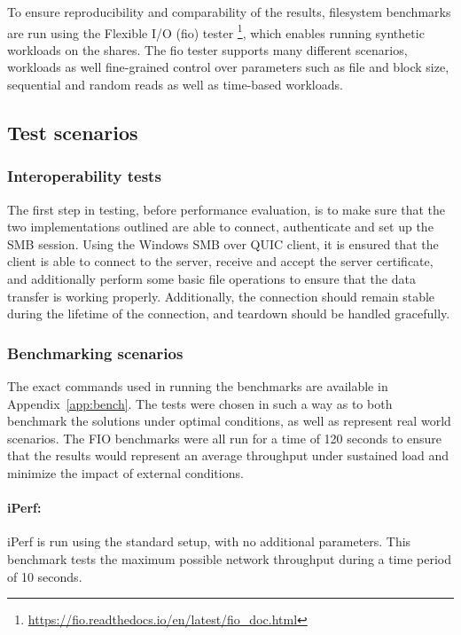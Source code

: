 \documentclass[english, 12pt, a4paper, elec, utf8, a-2b, online]{aaltothesis}
\begin{document}
To ensure reproducibility and comparability of the results, filesystem benchmarks are run
using the Flexible I/O (fio) tester \footnote{\url{https://fio.readthedocs.io/en/latest/fio_doc.html}},
which enables running synthetic workloads on the shares. The fio tester supports
many different scenarios, workloads as well fine-grained control over parameters
such as file and block size, sequential and random reads as well as time-based workloads.

\subsection{Test scenarios}

\subsubsection{Interoperability tests}

The first step in testing, before performance evaluation, is to make sure that
the two implementations outlined are able to connect, authenticate and set up
the SMB session. Using the Windows SMB over QUIC client, it is ensured that the client
is able to connect to the server, receive and accept the server certificate, and
additionally perform some basic file operations to ensure that the data transfer is
working properly. Additionally, the connection should remain stable during the lifetime
of the connection, and teardown should be handled gracefully.

\subsubsection{Benchmarking scenarios}

The exact commands used in running the benchmarks are available in Appendix~\ref{app:bench}.
The tests were chosen in such a way as to both benchmark the solutions under optimal conditions,
as well as represent real world scenarios. The FIO benchmarks were all run for a time of
120 seconds to ensure that the results would represent an average throughput under sustained
load and minimize the impact of external conditions.

\paragraph{iPerf:}
iPerf is run using the standard setup, with no additional parameters. This benchmark tests
the maximum possible network throughput during a time period of 10 seconds.
\end{document}
